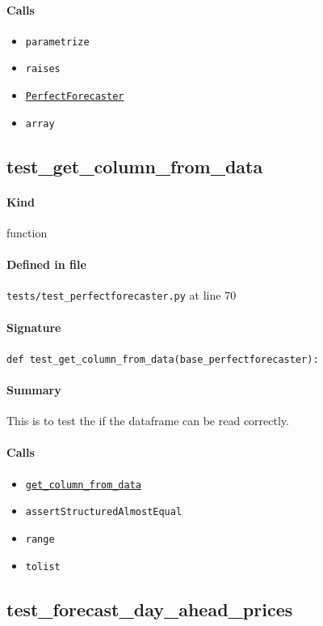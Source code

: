 \documentclass[11pt]{report}
\begin{document}
\paragraph{Calls}
\begin{itemize}[leftmargin=*]
  \item \texttt{parametrize}
  \item \texttt{raises}
  \item \hyperref[def:forecaster.py:PerfectForecaster:L686]{\texttt{PerfectForecaster}}
  \item \texttt{array}
\end{itemize}
\subsection{test\_get\_column\_from\_data}
\label{def:tests-test_perfectforecaster.py:test_get_column_from_data:L70}
\paragraph{Kind} function
\paragraph{Defined in file} \texttt{tests/test\_perfectforecaster.py} at line 70
\paragraph{Signature} \texttt{def test\_get\_column\_from\_data(base\_perfectforecaster):}
\paragraph{Summary} This is to test the if the dataframe can be read correctly.
\paragraph{Calls}
\begin{itemize}[leftmargin=*]
  \item \hyperref[def:forecaster.py:PerfectForecaster.get_column_from_data:L762]{\texttt{get\_column\_from\_data}}
  \item \texttt{assertStructuredAlmostEqual}
  \item \texttt{range}
  \item \texttt{tolist}
\end{itemize}
\subsection{test\_forecast\_day\_ahead\_prices}
\label{def:tests-test_perfectforecaster.py:test_forecast_day_ahead_prices:L89}
\end{document}
